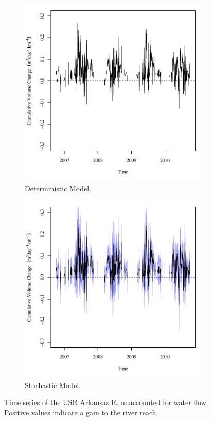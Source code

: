 \begin{linenumbers}
\begin{figure}[htbp]
\centering
	\begin{subfigure}{0.5\textwidth}
		\centering
		\includegraphics[width=0.9\linewidth]{"Figures/Results_DUSR/Balance Water"}
		\caption{Deterministic Model.}
		\label{sub:USRWaterD}
	\end{subfigure}%
	\begin{subfigure}{0.5\textwidth}
		\centering
		\includegraphics[width=0.9\linewidth]{"Figures/Results_USR/Balance Water"}
		\caption{Stochastic Model.}
		\label{sub:USRWaterS}
	\end{subfigure}
	\caption[Time series of the USR Arkansas R. unaccounted for water flow.]{Time series of the USR Arkansas R. unaccounted for water flow.  Positive values indicate a gain to the river reach.}
	\label{fig:USRWater}
\end{figure}


\end{linenumbers}
